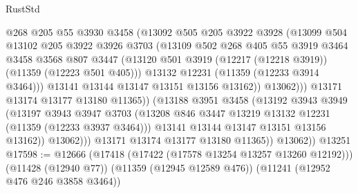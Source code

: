 \begin{lexlean}{RustStd}
\begin{coremodule}
{{{{{{{{{{{{{{{{{{{                          @268
                          @205
                          @55
                          @3930
                          @3458
                          (@13092
                            @505
                            @205
                            @3922
                            @3928
                            (@13099
                              @504
                              @13102
                              @205
                              @3922
                              @3926
                              @3703
                              (@13109
                                @502
                                @268
                                @405
                                @55
                                @3919
                                @3464
                                @3458
                                @3568
                                @807
                                @3447
                                (@13120
                                  @501
                                  @3919
                                  (@12217 (@12218 @3919))
                                  (@11359 (@12223 @501 @405)))
                                @13132
                                @12231
                                (@11359 (@12233 @3914 @3464)))
                              @13141
                              @13144
                              @13147
                              @13151
                              @13156
                              @13162))
                          @13062)))
                    @13171
                    @13174
                    @13177
                    @13180
                    @11365))
                (@13188
                  @3951
                  @3458
                  (@13192
                    @3943
                    @3949
                    (@13197
                      @3943
                      @3947
                      @3703
                      (@13208 @846 @3447 @13219 @13132 @12231 (@11359 (@12233 @3937 @3464)))
                      @13141
                      @13144
                      @13147
                      @13151
                      @13156
                      @13162))
                  @13062)))
            @13171
            @13174
            @13177
            @13180
            @11365))
        @13062))
    @13251
@17598 := @12666
    (@17418 (@17422 (@17578 @13254 @13257 @13260 @12192)))
    (@11428 (@12940 @77))
    (@11359 (@12945 @12589 @476))
    (@11241 (@12952 @476 @246 @3858 @3464))
}}}}}}}}}}}}}}}}}}}
\end{coremodule}
\end{lexlean}
